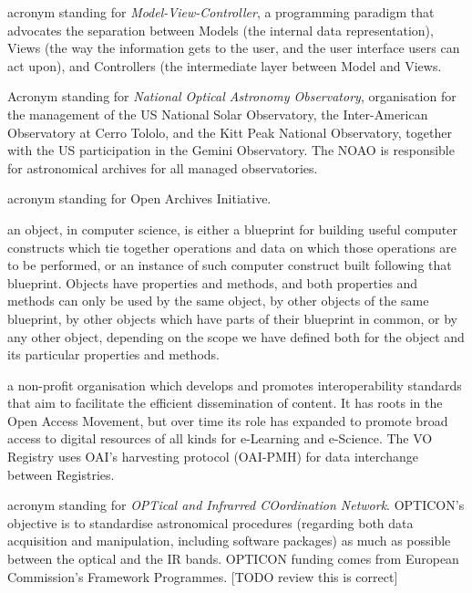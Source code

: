 {
    	acronym standing for \emph{Model-View-Controller}, a
        programming paradigm that advocates the separation between
        \gls{Models} (the internal data representation), \gls{Views}
        (the way the information gets to the user, and the user
        interface users can act upon), and \gls{Controllers} (the
        intermediate layer between Model and Views.
}

{
    	Acronym standing for \emph{National Optical Astronomy
        Observatory}, organisation for the management of the US
        National Solar Observatory, the Inter-American Observatory at
        Cerro Tololo, and the Kitt Peak National Observatory, together
        with the US participation in the Gemini Observatory. The NOAO
        is responsible for astronomical archives for all managed
        observatories.
}

{
    	acronym standing for \gls{Open Archives Initiative}.
}

{
    	an object, in computer science, is either a blueprint for
        building useful computer constructs which tie together
        operations and data on which those operations are to be
        performed, or an instance of such computer construct built
        following that blueprint. Objects have properties and methods,
        and both properties and methods can only be used by the same
        object, by other objects of the same blueprint, by other
        objects which have parts of their blueprint in common, or by
        any other object, depending on the scope we have defined both
        for the object and its particular properties and methods.
}

{
    	a non-profit organisation which develops and promotes
        interoperability standards that aim to facilitate the efficient
        dissemination of content. It has roots in the Open Access
        Movement, but over time its role has expanded to promote broad
        access to digital resources of all kinds for \gls{e-Learning}
        and \gls{e-Science}. The VO \gls{Registry} uses OAI's
        harvesting protocol (OAI-PMH) for data interchange between
        Registries.
}

{
    	acronym standing for \emph{OPTical and Infrarred COordination
        Network}. OPTICON's objective is to standardise astronomical
        procedures (regarding both data acquisition and manipulation,
        including software packages) as much as possible between the
        \gls{optical} and the \gls{IR} bands. OPTICON funding comes
        from European Commission's Framework Programmes. [TODO review
        this is correct]
}

